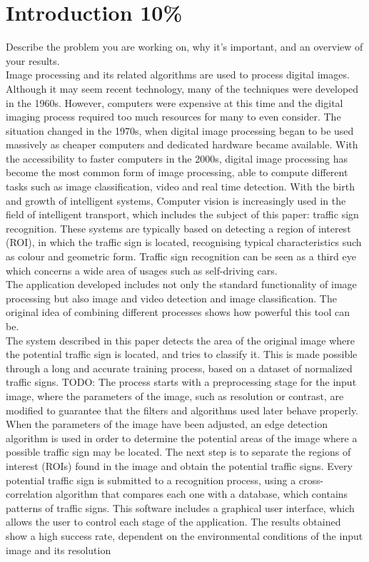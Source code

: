 \documentclass[10pt,twocolumn,letterpaper]{article}
\begin{document}
\section{Introduction 10\%}
Describe the problem you are working on, why it's important, and an overview of your results.\\
Image processing and its related algorithms are used to process digital images. Although it may seem recent technology, many of the techniques were developed in the 1960s. However, computers were expensive at this time and the digital imaging process required too much resources for many to even consider. The situation changed in the 1970s, when digital image processing began to be used massively as cheaper computers and dedicated hardware became available. With the accessibility to faster computers in the 2000s, digital image processing has become the most common form of image processing, able to compute different tasks such as image classification, video and real time detection. With the birth and growth of intelligent systems, Computer vision is increasingly used in the field of intelligent transport, which includes the subject of this paper: traffic sign recognition. These systems are typically based on detecting a region of interest (ROI), in which the traffic sign is located, recognising typical characteristics such as colour and geometric form.
Traffic sign recognition can be seen as a third eye which concerns a wide area of usages such as self-driving cars.\\

The application developed includes not only the standard functionality of image processing but also image and video detection and image classification. The original idea of combining different processes shows how powerful this tool can be.\\

The system described in this paper detects the area of the original image where the potential traffic sign is located, and tries to classify it. This is made possible through a long and accurate training process, based on a dataset of normalized traffic signs. TODO: The process starts with a preprocessing stage for the input image, where the parameters of the image, such as resolution or contrast, are modified to guarantee that the filters and algorithms used later behave properly. When the parameters of the image have been adjusted, an edge detection algorithm is used in order to determine the potential areas of the image where a possible traffic sign may be located. The next step is to separate the regions of interest (ROIs) found in the image and obtain the potential traffic signs. Every potential traffic sign is submitted to a recognition process, using a cross-correlation algorithm that compares each one with a database, which contains patterns of traffic signs. This software includes a graphical user interface, which allows the user to control each stage of the application. The results obtained show a high success rate, dependent on the environmental conditions of the input image and its resolution
\end{document}
